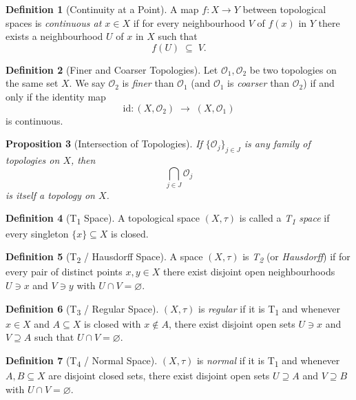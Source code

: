\documentclass[11pt,a4paper]{article}
\theoremstyle{definition}
\newtheorem{definition}{Definition}[section]
\theoremstyle{plain}
\newtheorem{proposition}[definition]{Proposition}
\theoremstyle{remark}
\begin{document}
\begin{definition}[Continuity at a Point]
A map \(f\colon X\to Y\) between topological spaces is \emph{continuous at \(x\in X\)} if for every neighbourhood \(V\) of \(f(x)\) in \(Y\) there exists a neighbourhood \(U\) of \(x\) in \(X\) such that
\[
  f(U)\;\subseteq\;V.
\]
\end{definition}

\begin{definition}[Finer and Coarser Topologies]
Let \(\mathcal O_1,\mathcal O_2\) be two topologies on the same set \(X\).  We say \(\mathcal O_2\) is \emph{finer} than \(\mathcal O_1\) (and \(\mathcal O_1\) is \emph{coarser} than \(\mathcal O_2\)) if and only if the identity map
\[
  \mathrm{id}\colon (X,\mathcal O_2)\;\longrightarrow\;(X,\mathcal O_1)
\]
is continuous.
\end{definition}

\begin{proposition}[Intersection of Topologies]
If \(\{\mathcal O_j\}_{j\in J}\) is any family of topologies on \(X\), then
\[
  \bigcap_{j\in J}\mathcal O_j
\]
is itself a topology on \(X\).
\end{proposition}

\begin{definition}[T\textsubscript{1} Space]
A topological space \((X,\tau)\) is called a \emph{T\textsubscript{1} space} if every singleton \(\{x\}\subseteq X\) is closed.
\end{definition}

\begin{definition}[T\textsubscript{2} / Hausdorff Space]
A space \((X,\tau)\) is \emph{T\textsubscript{2}} (or \emph{Hausdorff}) if for every pair of distinct points \(x,y\in X\) there exist disjoint open neighbourhoods \(U\ni x\) and \(V\ni y\) with \(U\cap V=\varnothing\).
\end{definition}

\begin{definition}[T\textsubscript{3} / Regular Space]
\((X,\tau)\) is \emph{regular} if it is T\textsubscript{1} and whenever \(x\in X\) and \(A\subseteq X\) is closed with \(x\notin A\), there exist disjoint open sets \(U\ni x\) and \(V\supseteq A\) such that \(U\cap V=\varnothing\).
\end{definition}

\begin{definition}[T\textsubscript{4} / Normal Space]
\((X,\tau)\) is \emph{normal} if it is T\textsubscript{1} and whenever \(A,B\subseteq X\) are disjoint closed sets, there exist disjoint open sets \(U\supseteq A\) and \(V\supseteq B\) with \(U\cap V=\varnothing\).
\end{definition}
\end{document}

